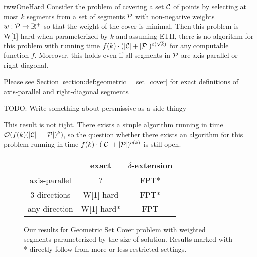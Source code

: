 \begin{restatable}{tw}{wOneHard}
\label{w1_hard}
	Consider the problem of covering a set $\mathcal{C}$ of points
	by selecting at most $k$ segments
	from a set of segments $\mathcal{P}$ 
	with non-negative weights $w : \mathcal{P} \rightarrow \mathbb{R^+}$
	so that the weight of the cover is minimal.
	Then this problem is W[1]-hard when parameterized by $k$ and
	assuming ETH, there is no algorithm for this
	problem with running time
	$f(k)\cdot(|\mathcal{C}| + |\mathcal{P}|)^{o(\sqrt{k})}$
	for any computable function $f$.
	Moreover, this holds even if all segments in $\mathcal{P}$
	are axis-parallel or right-diagonal.
\end{restatable}

Please see Section \ref{section:def:geometric__set_cover}
for exact definitions of axis-parallel and right-diagonal segments.

TODO: Write something about persmissive as a side thingy

This result is not tight. There exists a simple algorithm 
running in time ${\mathcal{O}(f(k)(|\mathcal{C}| + |\mathcal{P}|)^k)}$,
so the question whether there exists an algorithm
for this problem running in time ${f(k)\cdot(|\mathcal{C}| + |\mathcal{P}|)^{o(k)}}$
is still open.

\begin{figure}[h]
\begin{center}
\begin{tabular}{ | c | c | c | }
\hline
                & exact     & $\delta$-extension \\ 
\hline                
 axis-parallel   & ? & FPT* \\  
\hline                
 3 directions    & W[1]-hard & FPT* \\  
\hline                
 any direction   & W[1]-hard* & FPT \\
\hline                
\end{tabular}
\caption{Our results for Geometric Set Cover problem with weighted segments 
parameterized by the size of solution.
Results marked with * directly follow from more or less restricted settings.}
\label{tab:weighted_fpt}
\end{center}
\end{figure}
